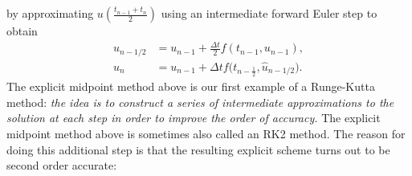 by approximating $u(\frac{t_{n-1} + t_n}{2})$ 
using an intermediate forward Euler step to obtain 
\begin{equation}\label{eq:explicit-midpoint}
    \begin{aligned}
    \hat{u}_{n-1/2} &= u_{n-1} + \frac{\Delta t}{2} f(t_{n-1}, u_{n-1}),\\
    u_n &= u_{n-1} + \Delta t f\Big(t_{n- \frac12}, \hat{u}_{n-1/2}\Big).
    \end{aligned}
\end{equation}
The explicit midpoint method above is our first example of a 
Runge-Kutta method: {\it the idea is to construct a series 
of intermediate approximations to the solution at each 
step in order to improve the order of accuracy.}
The explicit midpoint method above is sometimes also 
called an RK2 method. The reason for doing 
this additional step is that the resulting 
explicit scheme turns out to be second order accurate:

